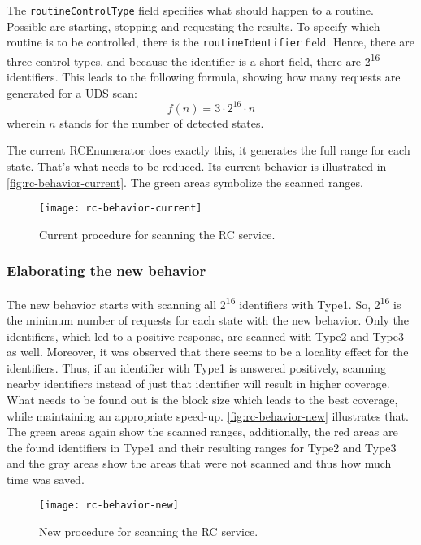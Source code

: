 The \texttt{routineControlType} field specifies what should happen to a routine. Possible are starting, stopping and requesting the results. To specify which routine is to be controlled, there is the \texttt{routineIdentifier} field. Hence, there are three control types, and because the identifier is a short field, there are 2\textsuperscript{16} identifiers. This leads to the following formula, showing how many requests are generated for a UDS scan:
\[f(n)=3 \cdot 2^{16} \cdot n\]
wherein $n$ stands for the number of detected states.

The current RCEnumerator does exactly this, it generates the full range for each state. That's what needs to be reduced. Its current behavior is illustrated in \autoref{fig:rc-behavior-current}. The green areas symbolize the scanned ranges.

\begin{figure}[h]
    \centering
    \texttt{[image: rc-behavior-current]}
    \caption{Current procedure for scanning the RC service.}
    \label{fig:rc-behavior-current}
\end{figure}

\subsubsection{Elaborating the new behavior}

The new behavior starts with scanning all 2\textsuperscript{16} identifiers with Type1. So, 2\textsuperscript{16} is the minimum number of requests for each state with the new behavior. Only the identifiers, which led to a positive response, are scanned with Type2 and Type3 as well. Moreover, it was observed that there seems to be a locality effect for the identifiers. Thus, if an identifier with Type1 is answered positively, scanning nearby identifiers instead of just that identifier will result in higher coverage. What needs to be found out is the block size which leads to the best coverage, while maintaining an appropriate speed-up. \autoref{fig:rc-behavior-new} illustrates that. The green areas again show the scanned ranges, additionally, the red areas are the found identifiers in Type1 and their resulting ranges for Type2 and Type3 and the gray areas show the areas that were not scanned and thus how much time was saved.

\begin{figure}[h]
    \centering
    \texttt{[image: rc-behavior-new]}
    \caption{New procedure for scanning the RC service.}
    \label{fig:rc-behavior-new}
\end{figure}


